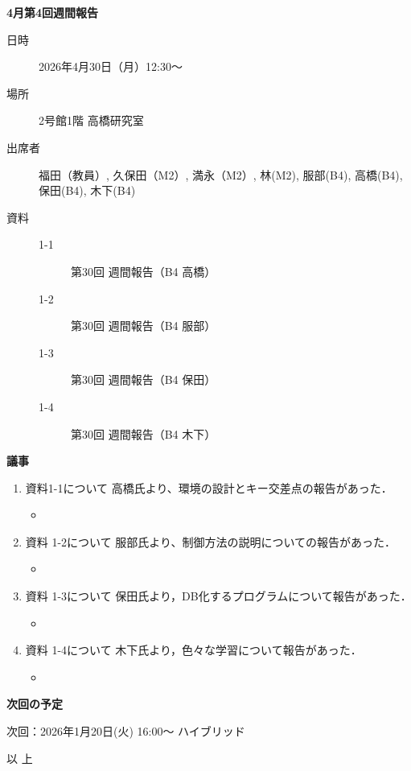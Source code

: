 \documentclass[a4paper]{ujarticle}
\begin{document}
\begin{center}
\bf{4月第4回週間報告}
\end{center}
\bigskip

%
\begin{description}
\item[日時] 2026年4月30日（月）12:30～
\item[場所] 2号館1階 高橋研究室
\item[出席者] 福田（教員）, 久保田（M2）, 満永（M2）, 林(M2), 服部(B4), 高橋(B4), 保田(B4), 木下(B4)
\item[資料] \begin{description}
              \item[1-1]  第30回 週間報告（B4 高橋）
              \item[1-2]  第30回 週間報告（B4 服部）
              \item[1-3]  第30回 週間報告（B4 保田）
              \item[1-4]  第30回 週間報告（B4 木下）
            \end{description}
\end{description}


{\bfseries 議事}

\begin{enumerate}
\item 資料1-1について
高橋氏より、環境の設計とキー交差点の報告があった．
\begin{itemize}
    \item 
\end{itemize}

\item 資料 1-2について
服部氏より、制御方法の説明についての報告があった．
\begin{itemize}
    \item 
\end{itemize}

\item 資料 1-3について
保田氏より，DB化するプログラムについて報告があった．
\begin{itemize}
    \item  
\end{itemize}

\item 資料 1-4について
木下氏より，色々な学習について報告があった．
\begin{itemize}
     \item 
\end{itemize}

\end{enumerate}

{\bfseries 次回の予定}

次回：2026年1月20日(火) 16:00～ ハイブリッド

\begin{flushright}
以  上
\end{flushright}
\end{document}
